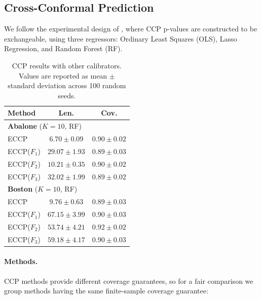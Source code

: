 \documentclass{article}
\theoremstyle{plain}
\theoremstyle{definition}
\theoremstyle{remark}
\begin{document}
\subsection{Cross-Conformal Prediction}

We follow the experimental design of \citet{gasparinimproving}, where CCP p-values are constructed to be exchangeable, using three regressors: Ordinary Least Squares (OLS), Lasso Regression, and Random Forest (RF). %

\begin{table}[t]
\centering
\small
\setlength{\tabcolsep}{6pt}
\begin{tabular}{lcc}
\toprule
Method & Len. & Cov.  \\
\midrule
\multicolumn{3}{l}{\textbf{Abalone} ($K{=}10$, RF)}\\
ECCP        & $6.70 \pm 0.09$ & $0.90 \pm 0.02$ \\
ECCP($F_1$) & $29.07 \pm 1.93$ & $0.89 \pm 0.03$ \\
ECCP($F_2$) & $10.21 \pm 0.35$ & $0.90 \pm 0.02$ \\
ECCP($F_3$) & $32.02 \pm 1.99$ & $0.89 \pm 0.02$ \\
\midrule
\multicolumn{3}{l}{\textbf{Boston} ($K{=}10$, RF)}\\
ECCP        & $9.76 \pm 0.63$ & $0.89 \pm 0.03$ \\
ECCP($F_1$) & $67.15 \pm 3.99$ & $0.90 \pm 0.03$ \\
ECCP($F_2$) & $53.74 \pm 4.21$ & $0.92 \pm 0.02$ \\
ECCP($F_3$) & $59.18 \pm 4.17$ & $0.90 \pm 0.03$ \\
\bottomrule
\end{tabular}
\caption{CCP results with other calibrators. Values are reported as mean $\pm$ standard deviation across 100 random seeds.}
\label{tab:rf_abalone_boston_k10_other_ptoe}
\end{table}



\paragraph{Methods.}
CCP methods provide different coverage guarantees, so for a fair comparison we group methods having the same finite-sample coverage guarantee: 
\end{document}
